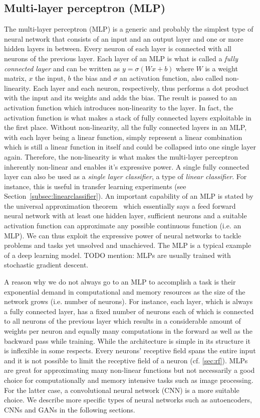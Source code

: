 \documentclass[12pt,a4paper]{article}
\begin{document}
\subsection{Multi-layer perceptron (MLP)}\label{subsec:mlp}
The multi-layer perceptron (MLP) is a generic and probably the simplest type of neural network that consists of an input and an output layer and one or more hidden layers in between. Every neuron of each layer is connected with all neurons of the previous layer. Each layer of an MLP is what is called a \textit{fully connected layer} and can be written as $y = \sigma (Wx + b)$ where $W$ is a weight matrix, $x$ the input, $b$ the bias and $\sigma$ an activation function, also called non-linearity. Each layer and each neuron, respectively, thus performs a dot product with the input and its weights and adds the bias. The result is passed to an activation function which introduces non-linearity to the layer. In fact, the activation function is what makes a stack of fully connected layers exploitable in the first place. Without non-linearity, all the fully connected layers in an MLP, with each layer being a linear function, simply represent a linear combination which is still a linear function in itself and could be collapsed into one single layer again. Therefore, the non-linearity is what makes the multi-layer perceptron inherently non-linear and enables it's expressive power. A single fully connected layer can also be used as a \textit{single layer classifier}, a type of \textit{linear classifier}. For instance, this is useful in transfer learning experiments (see Section~\ref{subsec:linearclassifier}). An important capability of an MLP is stated by the universal approximation theorem~\cite{mlpUnivApprox} which essentially says a feed forward neural network with at least one hidden layer, sufficient neurons and a suitable activation function can approximate any possible continuous function (i.e. an MLP). We can thus exploit the expressive power of neural networks to tackle problems and tasks yet unsolved and unachieved. The MLP is a typical example of a deep learning model.
TODO mention: MLPs are usually trained with stochastic gradient descent.

A reason why we do not always go to an MLP to accomplish a task is their exponential demand in computational and memory resources as the size of the network grows (i.e. number of neurons). For instance, each layer, which is always a fully connected layer, has a fixed number of neurons each of which is connected to all neurons of the previous layer which results in a considerable amount of weights per neuron and equally many computations in the forward as well as the backward pass while training. While the architecture is simple in its structure it is inflexible in some respects. Every neurons' receptive field spans the entire input and it is not possible to limit the receptive field of a neuron (cf. \ref{sec:rf}). MLPs are great for approximating many non-linear functions but not necessarily a good choice for computationally and memory intensive tasks such as image processing. For the latter case, a convolutional neural network (CNN) is a more suitable choice. We describe more specific types of neural networks such as autoencoders, CNNs and GANs in the following sections.
\end{document}

